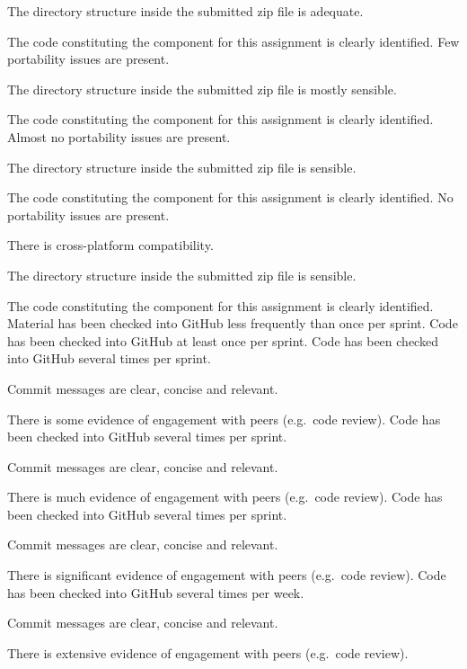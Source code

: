 \documentclass{../../fal_assignment}
\begin{document}
\begin{markingrubric}
            \par The directory structure inside the submitted zip file is adequate.
            \par The code constituting the component for this assignment is clearly identified.
        \grade Few portability issues are present.
            \par The directory structure inside the submitted zip file is mostly sensible.
            \par The code constituting the component for this assignment is clearly identified.
        \grade Almost no portability issues are present.
            \par The directory structure inside the submitted zip file is sensible.
            \par The code constituting the component for this assignment is clearly identified.
        \grade No portability issues are present.
            \par There is cross-platform compatibility.
            \par The directory structure inside the submitted zip file is sensible.
            \par The code constituting the component for this assignment is clearly identified.
%
        \grade \fail Material has been checked into GitHub less frequently than once per sprint.
        \grade Code has been checked into GitHub at least once per sprint.
        \grade Code has been checked into GitHub several times per sprint.
            \par Commit messages are clear, concise and relevant.
            \par There is some evidence of engagement with peers (e.g.\ code review).
        \grade Code has been checked into GitHub several times per sprint.
            \par Commit messages are clear, concise and relevant.
            \par There is much evidence of engagement with peers (e.g.\ code review).
        \grade Code has been checked into GitHub several times per sprint.
            \par Commit messages are clear, concise and relevant.
            \par There is significant evidence of engagement with peers (e.g.\ code review).
        \grade Code has been checked into GitHub several times per week.
            \par Commit messages are clear, concise and relevant.
            \par There is extensive evidence of engagement with peers (e.g.\ code review).
\end{markingrubric}
\end{document}

